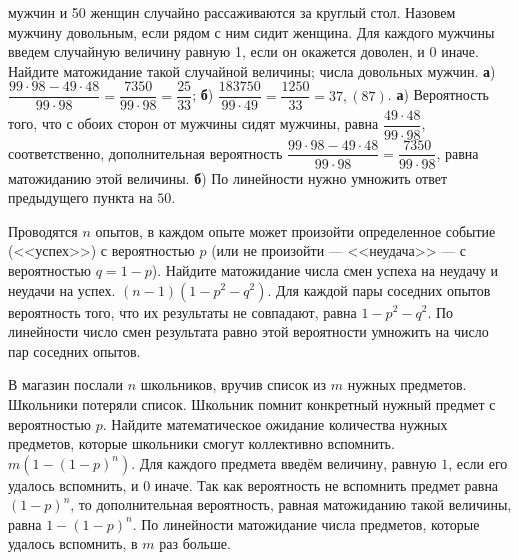 \documentclass[a4paper,11pt]{article}
\begin{document}
 мужчин и 50 женщин случайно рассаживаются за круглый стол.
Назовем мужчину довольным, если рядом с ним сидит женщина.
Для каждого мужчины введем случайную величину равную 1, если он окажется доволен, и 0 иначе.
Найдите матожидание
 такой случайной величины;
 числа довольных мужчин.
\textbf{а}) $\dfrac{99 \cdot 98 - 49 \cdot 48}{99 \cdot 98} = \dfrac{7350}{99 \cdot 98}=\dfrac{25}{33}$;
\textbf{б}) $\dfrac{183750}{99 \cdot 49} =\dfrac{1250}{33} = 37{,}(87)$.
\textbf{а}) Вероятность того, что с обоих сторон от мужчины сидят мужчины, равна $\dfrac{49 \cdot 48}{99 \cdot 98}$, соответственно, дополнительная вероятность $\dfrac{99 \cdot 98 - 49 \cdot 48}{99 \cdot 98}=\dfrac{7350}{99 \cdot 98}$, равна матожиданию этой величины.
\textbf{б}) По линейности нужно умножить ответ предыдущего пункта на $50$.










Проводятся $n$ опытов, в каждом опыте может произойти определенное событие (<<успех>>) с вероятностью $p$ (или не произойти --- <<неудача>> --- с вероятностью $q=1-p$).
Найдите матожидание числа смен успеха на неудачу и неудачи на успех.
$(n-1)(1-p^2-q^2)$.
Для каждой пары соседних опытов вероятность того, что их результаты не совпадают, равна $1-p^2-q^2$. По линейности число смен результата равно этой вероятности умножить на число пар соседних опытов.




\newpage





В магазин послали $n$ школьников, вручив список из $m$ нужных предметов.
Школьники потеряли список.
Школьник помнит конкретный нужный предмет с вероятностью $p$.
Найдите математическое ожидание количества нужных предметов, которые школьники смогут коллективно вспомнить.
$m(1-(1-p)^n)$.
Для каждого предмета введём величину, равную $1$, если его удалось вспомнить, и $0$ иначе. Так как вероятность не вспомнить предмет равна $(1-p)^n$, то дополнительная вероятность, равная матожиданию такой величины, равна $1-(1-p)^n$. По линейности матожидание числа предметов, которые удалось вспомнить, в $m$ раз больше.
\end{document}
